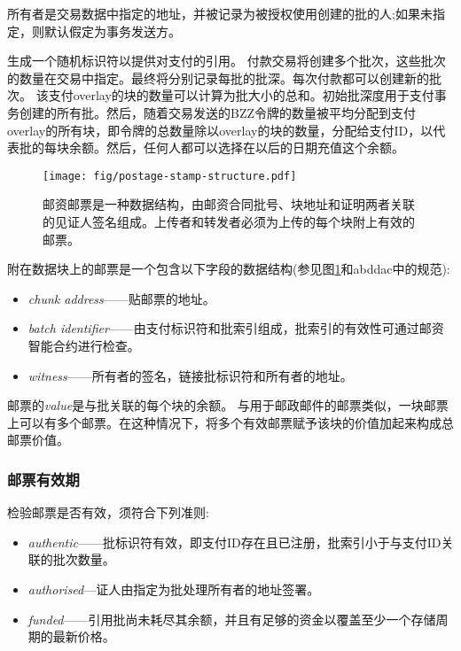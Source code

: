 所有者是交易数据中指定的地址，并被记录为被授权使用创建的批的人;如果未指定，则默认假定为事务发送方。

生成一个随机标识符以提供对支付的引用。
付款交易将创建多个批次，这些批次的数量在交易中指定。最终将分别记录每批的批深。每次付款都可以创建新的批次。
该支付overlay的块的数量可以计算为批大小的总和。初始批深度用于支付事务创建的所有批。然后，随着交易发送的BZZ令牌的数量被平均分配到支付overlay的所有块，即令牌的总数量除以overlay的块的数量，分配给支付ID，以代表批的每块余额。然后，任何人都可以选择在以后的日期充值这个余额。 


\begin{figure}[htbp]
  \centering
    \texttt{[image: fig/postage-stamp-structure.pdf]}
  \caption[邮票\statusgreen]{邮资邮票是一种数据结构，由邮资合同批号、块地址和证明两者关联的见证人签名组成。上传者和转发者必须为上传的每个块附上有效的邮票。 }
  \label{fig:postage-stamp}
\end{figure}


附在数据块上的邮票是一个包含以下字段的数据结构(参见图\ref{fig:postage-stamp}和abddac中的规范):

\begin{itemize}
    \item \emph{chunk address}——贴邮票的地址。 
    \item \emph{batch identifier}——由支付标识符和批索引组成，批索引的有效性可通过邮资智能合约进行检查。
    \item \emph{witness}——所有者的签名，链接批标识符和所有者的地址。
\end{itemize}

邮票的\emph{value}是与批关联的每个块的余额。
与用于邮政邮件的邮票类似，一块邮票上可以有多个邮票。在这种情况下，将多个有效邮票赋予该块的价值加起来构成总邮票价值。 

\subsubsection{邮票有效期}

检验邮票是否有效，须符合下列准则:

\begin{itemize}
\item \emph{authentic}——批标识符有效，即支付ID存在且已注册，批索引小于与支付ID关联的批次数量。
\item \emph{authorised}—证人由指定为批处理所有者的地址签署。
\item \emph{funded}——引用批尚未耗尽其余额，并且有足够的资金以覆盖至少一个存储周期的最新价格。
\end{itemize}

